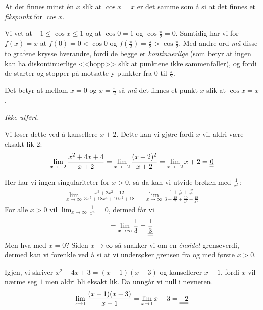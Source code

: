 \documentclass[a4paper,norsk,12pt]{article}
\begin{document}
At det finnes minst én $x$ slik at $\cos{x}=x$ er det samme som å si at det
finnes et \textit{fikspunkt} for $\cos{x}$.

Vi vet at $-1 \leq \cos{x} \leq 1$ og at $\cos{0} = 1$ og $\cos{\frac{\pi}{2}}
= 0$. Samtidig har vi for $f(x)=x$ at $f(0) = 0 < \cos{0}$ og $f(\frac{\pi}{2})
= \frac{\pi}{2} > \cos{\frac{\pi}{2}}$. Med andre ord \textit{må} disse to
grafene krysse hverandre, fordi de begge er \textit{kontinuerlige} (som betyr
at ingen kan ha diskontinuerlige <<hopp>> slik at punktene ikke sammenfaller),
og fordi de starter og stopper på motsatte y-punkter fra $0$ til
$\frac{\pi}{2}$.

Det betyr at mellom $x=0$ og $x=\frac{\pi}{2}$ så \textit{må} det finnes et punkt $x$
slik at $\cos{x} = x$.

\textit{Ikke utført.}

Vi løser dette ved å kansellere $x+2$. Dette kan vi gjøre
fordi $x$ vil aldri være eksakt lik $2$:
\begin{equation*}
\begin{split}
  \lim_{x \to -2}{\frac{x^2+4x+4}{x+2}} = \lim_{x \to -2}{\frac{(x+2)^2}{x+2}}
  = \lim_{x \to -2}{x+2} = {\underline{\underline{0}}}
\end{split}
\end{equation*}

Her har vi ingen singulariteter for $x>0$, så da kan vi utvide brøken med
$\frac{1}{x^5}$:
\begin{equation*}
\begin{split}
  \lim_{x \to \infty}{\frac{x^5+2x^2+12}{3x^5+18x^4+10x^2+18}} =
    \lim_{x \to \infty}{
        \frac{
          1+\frac{2}{x^3}+\frac{12}{x^5}
        }{
          3+\frac{18}{x}+\frac{10}{x^3}+\frac{18}{x^5}
      }}
\end{split}
\end{equation*}
For alle $x>0$ vil $\lim_{x \to \infty}{\frac{1}{x^n}} = 0$, dermed får vi
\begin{equation*}
\begin{split}
  = \lim_{x \to \infty}{\frac{1}{3}} = {\underline{\underline{\frac{1}{3}}}}
\end{split}
\end{equation*}
Men hva med $x=0$? Siden $x\to\infty$ så snakker vi om en \textit{énsidet}
grenseverdi, dermed kan vi forenkle ved å si at vi undersøker grensen fra og
med første $x>0$.

Igjen, vi skriver $x^2-4x+3 = (x-1)(x-3)$ og kansellerer $x-1$, fordi $x$ vil
nærme seg $1$ men aldri bli eksakt lik. Da unngår vi null i nevneren.
\begin{equation*}
\begin{split}
  \lim_{x \to 1}{\frac{(x-1)(x-3)}{x-1}} =
  \lim_{x \to 1}{x-3} = {\underline{\underline{-2}}}
\end{split}
\end{equation*}
\end{document}
